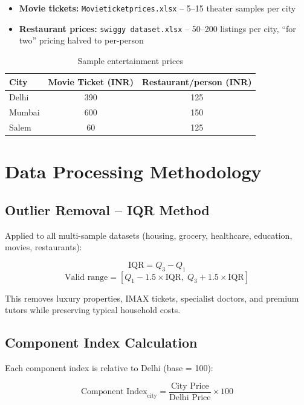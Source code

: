 \documentclass[12pt,a4paper]{article}
\begin{document}
\begin{itemize}[leftmargin=*]
  \item \textbf{Movie tickets:} \texttt{Movieticketprices.xlsx} -- 5--15 theater samples per city
  \item \textbf{Restaurant prices:} \texttt{swiggy dataset.xlsx} -- 50--200 listings per city,
        ``for two'' pricing halved to per-person
\end{itemize}

\begin{table}[H]
  \centering
  \begin{tabular}{lcc}
    \toprule
    \textbf{City} & \textbf{Movie Ticket (INR)} & \textbf{Restaurant/person (INR)} \\
    \midrule
    Delhi  & 390 & 125 \\
    Mumbai & 600 & 150 \\
    Salem  &  60 & 125 \\
    \bottomrule
  \end{tabular}
  \caption{Sample entertainment prices}
\end{table}

\section{Data Processing Methodology}

\subsection{Outlier Removal -- IQR Method}

Applied to all multi-sample datasets (housing, grocery, healthcare, education, movies,
restaurants):

\[
  \text{IQR} = Q_3 - Q_1
\]
\[
  \text{Valid range} = \left[Q_1 - 1.5 \times \text{IQR},\; Q_3 + 1.5 \times \text{IQR}\right]
\]

This removes luxury properties, IMAX tickets, specialist doctors, and premium tutors while
preserving typical household costs.

\subsection{Component Index Calculation}

Each component index is relative to Delhi (base = 100):

\[
  \text{Component Index}_{\text{city}} = \frac{\text{City Price}}{\text{Delhi Price}} \times 100
\]
\end{document}
